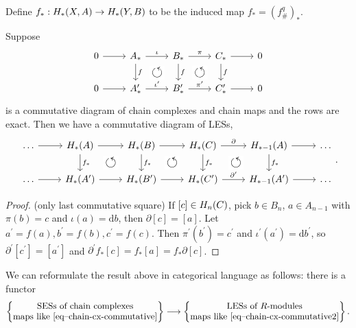 \documentclass[a4paper,11pt]{article}
\begin{document}
				Define $f_\ast:\hg{X,A}\rightarrow \hg{Y,B}$ to be the induced map $f_\ast=(f_\#^{q})_\ast$.

				\begin{lemma}\label{lem--LES-homology}
					Suppose 
					\begin{equation}\label{eq--chain-cx-commutative}
						\begin{tikzcd}
							0\ar[r]& A_\ast \ar[d,"f"]\ar[r,"\iota"]& B_\ast \ar[d,"f"]\ar[r,"\pi"]& C_\ast \ar[d,"f"]\ar[r]& 0\\
							0\ar[r]& A^{\prime}_\ast\arrow[ur, phantom, "\scalebox{1.5}{$\circlearrowleft$}" description] \ar[r,"\iota^{\prime}"]& B^{\prime}_\ast\arrow[ur, phantom, "\scalebox{1.5}{$\circlearrowleft$}" description] \ar[r,"\pi^{\prime}"]& C^{\prime}_\ast \ar[r]& 0
						\end{tikzcd}
					\end{equation}
					is a commutative diagram of chain complexes and chain maps and the rows are exact. Then we have a commutative diagram of LESs,
					\begin{equation}\label{eq--chain-cx-commutative2}
						\begin{tikzcd}
							\dots\ar[r]& \hg{A}\ar[d,"f_\ast"]\ar[r]& \hg{B}\ar[d,"f_\ast"]\ar[r]& \hg{C}\ar[d,"f_\ast"]\ar[r,"\partial"]& \hg[\ast-1]{A}\ar[d,"f_\ast"]\ar[r]& \dots\\
							\dots\ar[r]& \hg{A^{\prime}}\arrow[ur, phantom, "\scalebox{1.5}{$\circlearrowleft$}" description]\ar[r]& \hg{B^{\prime}}\arrow[ur, phantom, "\scalebox{1.5}{$\circlearrowleft$}" description]\ar[r]& \hg{C^\prime}\arrow[ur, phantom, "\scalebox{1.5}{$\circlearrowleft$}" description]\ar[r,"\partial^\prime"]& \hg[\ast-1]{A^\prime}\ar[r]& \dots
						\end{tikzcd}.
					\end{equation}
				\end{lemma}
				\begin{proof}(only last commutative square)
					If $[c]\in\hg[n]{C}$, pick $b\in B_n$, $a\in A_{n-1}$ with $\pi (b)=c$ and $\iota(a)=\mathrm{d}b$, then $\partial[c]=[a]$. Let $a^{\prime}=f(a),b^\prime=f(b),c^\prime=f(c)$. Then $\pi^\prime(b^\prime)=c^\prime$ and $\iota^\prime(a^\prime)=\mathrm{d}b^\prime$, so $\partial^\prime[c^\prime]=[a^\prime]$ and $\partial^\prime f_\ast[c]=f_\ast[a]=f_\ast\partial[c]$.	
				\end{proof}

				We can reformulate the result above in categorical language as follows: there is a functor 
				\begin{equation*}
					\begin{Bmatrix}
						\text{\normalfont SESs of chain complexes}\\\text{\normalfont maps like \eqref{eq--chain-cx-commutative}}
					\end{Bmatrix}\longrightarrow\begin{Bmatrix}
						\text{\normalfont LESs of $R$-modules}\\\text{\normalfont maps like \eqref{eq--chain-cx-commutative2}}
					\end{Bmatrix}.
				\end{equation*}
				\vspace{1em}
\end{document}
